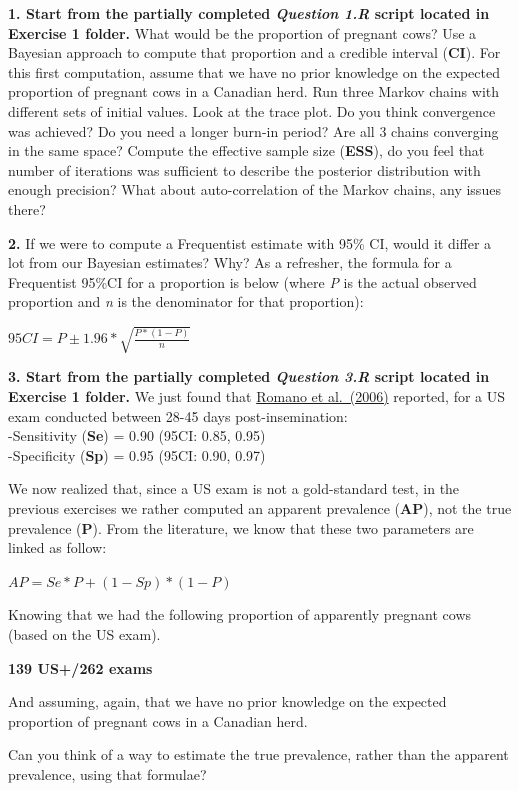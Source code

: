 \documentclass[
]{book}
\begin{document}
\textbf{1. Start from the partially completed \emph{Question 1.R} script located in Exercise 1 folder.} What would be the proportion of pregnant cows? Use a Bayesian approach to compute that proportion and a credible interval (\textbf{CI}). For this first computation, assume that we have no prior knowledge on the expected proportion of pregnant cows in a Canadian herd. Run three Markov chains with different sets of initial values. Look at the trace plot. Do you think convergence was achieved? Do you need a longer burn-in period? Are all 3 chains converging in the same space? Compute the effective sample size (\textbf{ESS}), do you feel that number of iterations was sufficient to describe the posterior distribution with enough precision? What about auto-correlation of the Markov chains, any issues there?

\textbf{2.} If we were to compute a Frequentist estimate with 95\% CI, would it differ a lot from our Bayesian estimates? Why? As a refresher, the formula for a Frequentist 95\%CI for a proportion is below (where \emph{P} is the actual observed proportion and \emph{n} is the denominator for that proportion):

\(95CI=P \pm 1.96* \sqrt{\frac{P*(1-P)}{n}}\)

\textbf{3. Start from the partially completed \emph{Question 3.R} script located in Exercise 1 folder.} We just found that \href{https://www.sciencedirect.com/science/article/pii/S0093691X06001543?via\%3Dihub}{Romano et al.~(2006)} reported, for a US exam conducted between 28-45 days post-insemination:\\
-Sensitivity (\textbf{Se}) = 0.90 (95CI: 0.85, 0.95)\\
-Specificity (\textbf{Sp}) = 0.95 (95CI: 0.90, 0.97)

We now realized that, since a US exam is not a gold-standard test, in the previous exercises we rather computed an apparent prevalence (\textbf{AP}), not the true prevalence (\textbf{P}). From the literature, we know that these two parameters are linked as follow:

\(AP= Se*P + (1-Sp)*(1-P)\)

Knowing that we had the following proportion of apparently pregnant cows (based on the US exam).

\textbf{139 US+/262 exams}

And assuming, again, that we have no prior knowledge on the expected proportion of pregnant cows in a Canadian herd.

Can you think of a way to estimate the true prevalence, rather than the apparent prevalence, using that formulae?
\end{document}
